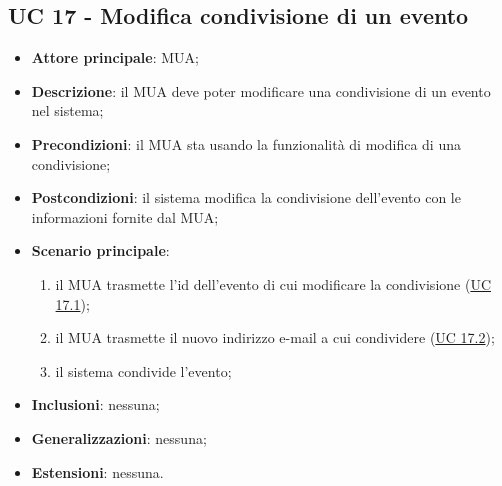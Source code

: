\subsection{UC 17 - Modifica condivisione di un evento} \label{sec:UC17}

    \begin{itemize}
        \item \textbf{Attore principale}: MUA;
        \item \textbf{Descrizione}: il MUA deve poter modificare una condivisione di un evento nel sistema;
        \item \textbf{Precondizioni}: il MUA sta usando la funzionalità di modifica di una condivisione;
        \item \textbf{Postcondizioni}: il sistema modifica la condivisione dell'evento con le informazioni fornite dal MUA;
        \item \textbf{Scenario principale}:
            \begin{enumerate}
                \item il MUA trasmette l'id dell'evento di cui modificare la condivisione (\hyperref[sec:UC17.1]{UC 17.1});
                \item il MUA trasmette il nuovo indirizzo e-mail a cui condividere (\hyperref[sec:UC17.2]{UC 17.2});
                \item il sistema condivide l'evento;
            \end{enumerate}
        \item \textbf{Inclusioni}: nessuna;
        \item \textbf{Generalizzazioni}: nessuna;
        \item \textbf{Estensioni}: nessuna.
    \end{itemize}

